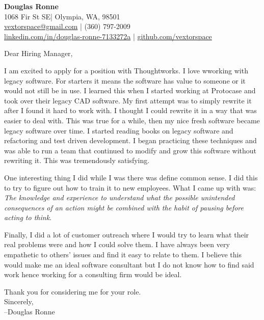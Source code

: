 \documentclass[letter,12pt]{article}
\begin{document}
\begin{center}
    {\Huge \textbf{Douglas Ronne}}\\
    \vspace{2mm}
    1068 Fir St SE| Olympia, WA, 98501\\
    \href{mailto:vextorspace@gmail.com}{vextorspace@gmail.com} | (360) 797-2009\\
    \href{www.linkedin.com/in/douglas-ronne-7133272a}{linkedin.com/in/douglas-ronne-7133272a} | \href{https://github.com/vextorspace}{github.com/vextorspace}
\end{center}

Dear Hiring Manager,

I am excited to apply for a position with Thoughtworks. I love wworking with legacy software. For starters it means the software has value to someone or it would not still be in use. I learned this when I started working at Protocase and took over their legacy CAD software. My first attempt was to simply rewrite it after I found it hard to work with. I thought I could rewrite it in a way that was easier to deal with. This was true for a while, then my nice fresh software became legacy software over time. I started reading books on legacy software and refactoring and test driven development. I began practicing these techniques and was able to run a team that continued to modify and grow this software without rewriting it. This was tremendously satisfying.

One interesting thing I did while I was there was define common sense. I did this to try to figure out how to train it to new employees. What I came up with was: \textit{The knowledge and experience to understand what the possible unintended consequences of an action might be combined with the habit of pausing before acting to think}.

Finally, I did a lot of customer outreach where I would try to learn what their real problems were and how I could solve them. I have always been very empathetic to others' issues and find it easy to relate to them. I believe this would make me an ideal software consultant but I do not know how to find said work hence working for a consulting firm would be ideal.

Thank you for considering me for your role.
\\
Sincerely,\\
--Douglas Ronne
\end{document}
